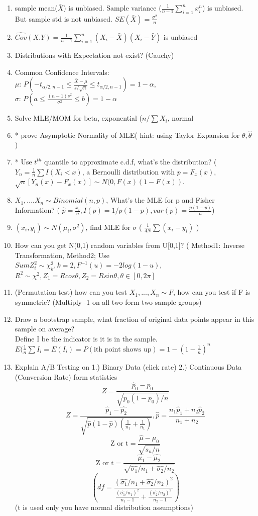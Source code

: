 \documentclass[11pt, openany]{book}              %
\begin{document}
\begin{enumerate}
    \item sample mean($\bar{X}$) is unbiased. Sample variance ($\frac{1}{n-1}\sum_{i=1}^n x_i^n$) is unbiased. But sample std is not unbiased. $SE(\bar{X})=\frac{\sigma^2}{n}$
    \item $\hat{Cov}(X.Y) = \frac{1}{n-1} \sum_{i=1}^n(X_i-\bar{X})(X_i-\bar{Y})$ is unbiased
    \item Distributions with Expectation not exist? (Cauchy) 
    \item Common Confidence Intervals:\\ $\mu$: $P(-t_{\alpha/2, n-1} \leq \frac{\bar{X}-\mu}{s/\sqrt{n}} \leq t_{\alpha/2, n-1})= 1- \alpha$, \\$\sigma$: $P(a \leq \frac{(n-1)s^2}{\sigma^2} \leq b)= 1-\alpha$
    \item Solve MLE/MOM for beta, exponential ($n/\sum{X_i}$, normal 
    \item * prove Asymptotic Normality of MLE( hint: using Taylor Expansion for $\theta, \hat{\theta}$ )
    \item * Use $t^{th}$ quantile to approximate c.d.f, what's the distribution? ($Y_n=\frac{1}{n} \sum I(X_i <x)$, a Bernoulli distribution with $p=F_x(x)$, $\sqrt{n}[Y_n(x) - F_x(x)] \sim N(0, F(x)(1-F(x))$.
 	\item $X_1, .... X_n \sim Binomial(n,p)$, What's the MLE for p and Fisher Information? ( $\hat{p}= \frac{x_i}{n}, I(p) = 1/p(1-p), var(p) = \frac{p(1-p)}{n}$)
 	\item $(x_i,y_i) \sim N(\mu_i, \sigma^2)$, find MLE for $\sigma$ ( $\frac{1}{4N} \sum(x_i-y_i)$ )
 	\item How can you get N(0,1) random variables from U[0,1]? ( Method1: Inverse Transformation, Method2; Use $Sum Z_i^2 \sim \chi_k^2, k = 2, F^{-1}(u) = -2log(1-u)$, $R^2 \sim \chi^2, Z_1 = Rcos\theta, Z_2 = Rsin\theta, \theta \in [0, 2\pi]$
 	\item (Permutation test) how can you test $X_1,...,X_n \sim F$, how can you test if F is symmetric? (Multiply -1 on all two form two sample groups)
 	\item Draw a bootstrap sample, what fraction of original data points appear in this sample on average?  
 	\\ Define I be the indicator is it is in the sample. $E(\frac{1}{n}\sum I_i= E(I_i) = P(\text{ith point shows up})= 1- (1-\frac{1}{n})^n$
 	\item Explain A/B Testing on 1.) Binary Data (click rate) 2.) Continuous Data (Conversion Rate) 
 		\subitem form statistics 
 	     $$Z = \frac{\hat{p}_0 - p_0}{\sqrt{p_0 (1-p_0)/n}}$$
 	     $$Z = \frac{\hat{p}_1 - \hat{p_2}}{\sqrt{\hat{p} (1-\hat{p})(\frac{1}{n_1} + \frac{1}{n_1})}}, \hat{p} = \frac{n_1 \hat{p}_1 + n_2 \hat{p}_2}{n_1 + n_2}$$
 	      $$ \text{Z or t} = \frac{\hat{\mu} -\mu_0}{\sqrt{s_n/n}}$$
 	     $$ \text{Z or t} = \frac{\hat{\mu_1} -\hat{\mu_2}}{\sqrt{\hat{\sigma_1}/n_1 + \hat{\sigma_2}/n_2}}$$
 	     $$ (df = \frac{(\hat{\sigma_1}/n_1 + \hat{\sigma_2}/n_2)^2}{\frac{(\hat{\sigma_1}/n_1)^2}{n_1-1} + \frac{(\hat{\sigma_2}/n_2)^2}{n_2-1}})$$
 	     (t is used only you have normal distribution assumptions)
\end{enumerate}
\end{document}
